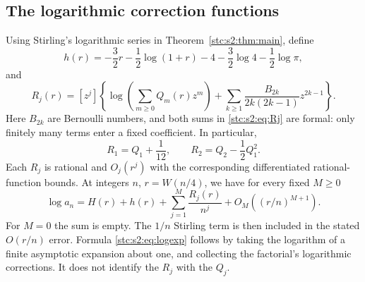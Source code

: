 \documentclass[11pt,letterpaper]{article}
\numberwithin{equation}{section}
\theoremstyle{remark}\newtheorem{remark}[theorem]{Remark}
\begin{document}
\subsection{The logarithmic correction functions}
Using Stirling's logarithmic series in Theorem~\ref{stc:s2:thm:main}, define
\begin{equation}\label{stc:s2:eq:h}
 h(r)=-\frac32r-\frac12\log(1+r)-4-\frac32\log4-\frac12\log\pi,
\end{equation}
and
\begin{equation}\label{stc:s2:eq:Rj}
 R_j(r)=[z^j]\left\{
 \log\!\left(\sum_{m\ge0}Q_m(r)z^m\right)
 +\sum_{k\ge1}\frac{B_{2k}}{2k(2k-1)}z^{2k-1}\right\}.
\end{equation}
Here $B_{2k}$ are Bernoulli numbers, and both sums in \eqref{stc:s2:eq:Rj} are formal: only finitely many terms enter a fixed coefficient. In particular,
\begin{equation}\label{stc:s2:eq:Rfirst}
 R_1=Q_1+\frac1{12},\qquad R_2=Q_2-\frac12Q_1^2.
\end{equation}
Each $R_j$ is rational and $O_j(r^j)$ with the corresponding differentiated rational-function bounds. At integers $n$, $r=W(n/4)$, we have for every fixed $M\ge0$
\begin{equation}\label{stc:s2:eq:logexp}
 \log a_n=H(r)+h(r)+\sum_{j=1}^M\frac{R_j(r)}{n^j}
 +O_M((r/n)^{M+1}).
\end{equation}
For $M=0$ the sum is empty. The $1/n$ Stirling term is then included in the stated $O(r/n)$ error. Formula \eqref{stc:s2:eq:logexp} follows by taking the logarithm of a finite asymptotic expansion about one, and collecting the factorial's logarithmic corrections. It does not identify the $R_j$ with the $Q_j$.
\end{document}
